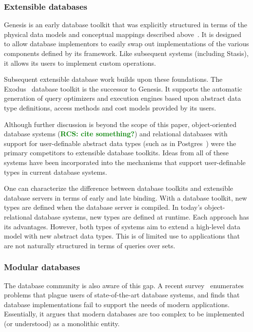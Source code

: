 \documentclass[letterpaper,twocolumn,10pt]{article}
\newcommand{\yad}{Stasis\xspace}
\newcommand{\rcs}[1]{\textcolor{green}{\bf RCS: #1}}
\begin{document}
\subsubsection{Extensible databases}

Genesis is an early database toolkit that was explicitly
structured in terms of the physical data models and conceptual 
mappings described above~\cite{genesis}.
It is designed to allow database implementors to easily swap out
implementations of the various components defined by its framework.
Like subsequent systems (including \yad), it allows its users to
implement custom operations.

Subsequent extensible database work builds upon these foundations.
The Exodus~\cite{exodus} database toolkit is the successor to
Genesis. It supports the automatic generation of query optimizers and
execution engines based upon abstract data type definitions, access
methods and cost models provided by its users.

Although further discussion is beyond the scope of this paper,
object-oriented database systems (\rcs{cite something?}) and relational databases with
support for user-definable abstract data types (such as in
Postgres~\cite{postgres}) were the primary competitors to extensible
database toolkits.  Ideas from all of these systems have been
incorporated into the mechanisms that support user-definable types in
current database systems.

One can characterize the difference between database toolkits and
extensible database servers in terms of early and late binding.  With
a database toolkit, new types are defined when the database server is
compiled.  In today's object-relational database systems, new types
are defined at runtime.  Each approach has its advantages.  However,
both types of systems aim to extend a high-level data model with new
abstract data types.  This is of limited use to applications that are 
not naturally structured in terms of queries over sets.

\subsubsection{Modular databases}

The database community is also aware of this gap.  A recent
survey~\cite{riscDB} enumerates problems that plague users of
state-of-the-art database systems, and finds that database
implementations fail to support the needs of modern applications.
Essentially, it argues that modern databases are too complex to be
implemented (or understood) as a monolithic entity.
\end{document}

